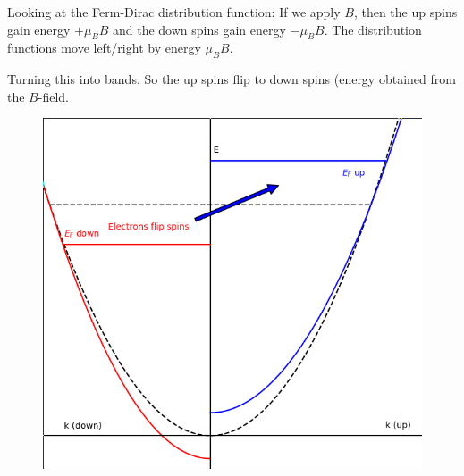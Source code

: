 \documentclass[a4paper, 11pt, normalem]{report}
\begin{document}
Looking at the Ferm-Dirac distribution function:
If we apply $B$, then the up spins gain energy $+\mu_BB$ and the down spins gain energy $-\mu_BB$.
The distribution functions move left/right by energy $\mu_BB$.

Turning this into bands.
So the up spins flip to down spins (energy obtained from the $B$-field.
\begin{figure}[H]
    \centering
    \includegraphics[scale=0.4]{elbnds.png}
\end{figure}

\chapter{}
\end{document}
